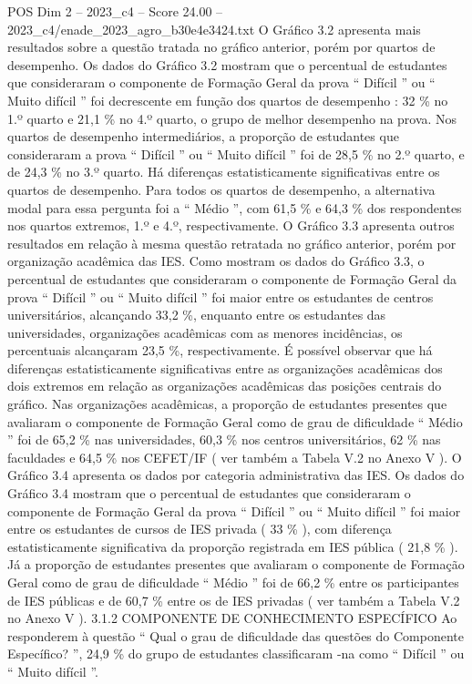 \begin{textsample}{POS Dim 2 – 2023\_c4 – Score 24.00 – 2023\_c4/enade\_2023\_agro\_b30e4e3424.txt}
O Gráfico 3.2 apresenta mais resultados sobre a questão tratada no gráfico anterior, porém por quartos de desempenho.
Os dados do Gráfico 3.2 mostram que o percentual de estudantes que consideraram o componente de Formação Geral da prova “ Difícil ” ou “ Muito difícil ” foi decrescente em função dos quartos de desempenho : 32 \% no 1.º quarto e 21,1 \% no 4.º quarto, o grupo de melhor desempenho na prova.
Nos quartos de desempenho intermediários, a proporção de estudantes que consideraram a prova “ Difícil ” ou “ Muito difícil ” foi de 28,5 \% no 2.º quarto, e de 24,3 \% no 3.º quarto.
Há diferenças estatisticamente significativas entre os quartos de desempenho.
Para todos os quartos de desempenho, a alternativa modal para essa pergunta foi a “ Médio ”, com 61,5 \% e 64,3 \% dos respondentes nos quartos extremos, 1.º e 4.º, respectivamente.
O Gráfico 3.3 apresenta outros resultados em relação à mesma questão retratada no gráfico anterior, porém por organização acadêmica das IES.
Como mostram os dados do Gráfico 3.3, o percentual de estudantes que consideraram o componente de Formação Geral da prova “ Difícil ” ou “ Muito difícil ” foi maior entre os estudantes de centros universitários, alcançando 33,2 \%, enquanto entre os estudantes das universidades, organizações acadêmicas com as menores incidências, os percentuais alcançaram 23,5 \%, respectivamente.
É possível observar que há diferenças estatisticamente significativas entre as organizações acadêmicas dos dois extremos em relação as organizações acadêmicas das posições centrais do gráfico.
Nas organizações acadêmicas, a proporção de estudantes presentes que avaliaram o componente de Formação Geral como de grau de dificuldade “ Médio ” foi de 65,2 \% nas universidades, 60,3 \% nos centros universitários, 62 \% nas faculdades e 64,5 \% nos CEFET/IF ( ver também a Tabela V.2 no Anexo V ).
O Gráfico 3.4 apresenta os dados por categoria administrativa das IES.
Os dados do Gráfico 3.4 mostram que o percentual de estudantes que consideraram o componente de Formação Geral da prova “ Difícil ” ou “ Muito difícil ” foi maior entre os estudantes de cursos de IES privada ( 33 \% ), com diferença estatisticamente significativa da proporção registrada em IES pública ( 21,8 \% ).
Já a proporção de estudantes presentes que avaliaram o componente de Formação Geral como de grau de dificuldade “ Médio ” foi de 66,2 \% entre os participantes de IES públicas e de 60,7 \% entre os de IES privadas ( ver também a Tabela V.2 no Anexo V ). 3.1.2 COMPONENTE DE CONHECIMENTO ESPECÍFICO Ao responderem à questão “ Qual o grau de dificuldade das questões do Componente Específico? ”, 24,9 \% do grupo de estudantes classificaram -na como “ Difícil ” ou “ Muito difícil ”.

\end{textsample}
